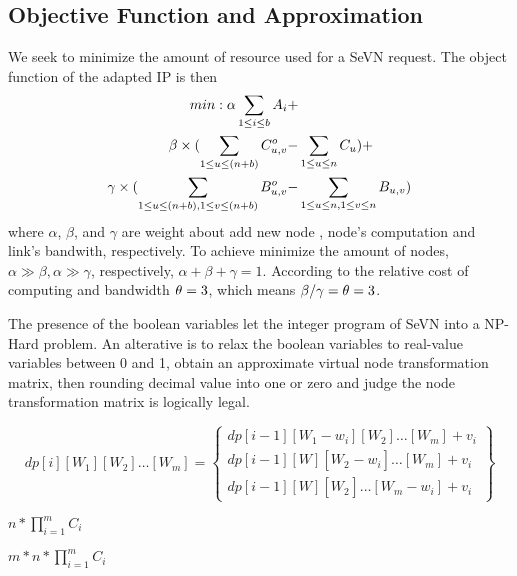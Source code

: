 \subsection{Objective Function and Approximation}
We seek to minimize the amount of resource used for a SeVN request. The object function of the adapted IP is then
\begin{align}
min: \alpha \sum_{1\leq i\leq b}A_i+ & \notag \\
\beta \times(\sum_{1\leq u\leq (n+b)}C^o_{u,v}- & \sum_{1\leq u\leq n}C_{u}) + \notag \\
\gamma \times(\sum_{1\leq u\leq (n+b),1\leq v\leq (n+b)}B^o_{u,v}- & \sum_{1\leq u\leq n,1\leq v\leq n}B_{u,v})
\end{align}
where $\alpha$, $\beta$, and $\gamma$ are weight about add new node , node's computation and link's bandwith, respectively. To achieve minimize the amount of nodes, $\alpha\gg\beta,\alpha\gg\gamma$, respectively, $\alpha+\beta+\gamma=1$. According to\cite{armbrust2009above,yu2010survivable} the relative cost of computing and bandwidth $\theta=3$, which means $\beta/\gamma=\theta=3$.

The presence of the boolean variables let the integer program of SeVN into a NP-Hard problem. An alterative is to relax the boolean variables to real-value variables between 0 and 1, obtain an approximate virtual node transformation matrix, then rounding decimal value into one or zero and judge the node transformation matrix is logically legal.




\begin{equation}
dp[i][{W_1}][{W_2}] \ldots [{W_m}] = \left\{ \begin{array}{l}
dp[i - 1][{W_1} - {w_i}][{W_2}] \ldots [{W_m}] + {v_i}\\
dp[i - 1][W][{W_2}_{} - {w_i}] \ldots [{W_m}] + {v_i}\\
dp[i - 1][W][{W_2}_{}] \ldots [{W_m} - {w_i}] + {v_i}
\end{array} \right\}
\end{equation}

$n*\prod_{i=1}^mC_i$

$m*n*\prod_{i=1}^mC_i$
